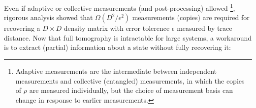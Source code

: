 \documentclass[
aps,
pra,
twocolumn,
floatfix,
]{revtex4-2}
\theoremstyle{plain}
\theoremstyle{definition}
\newtheorem{problem}{Problem}
\newcommand{\ob}{O}
\newcommand{\dm}{\rho}
\newcommand{\bmsigma}{\bm{\sigma}}
\begin{document}
Even if adaptive or collective measurements (and post-processing) allowed 
\footnote{Adaptive measurements are the intermediate between independent measurements and collective (entangled) measurements, in which the copies of $\dm$ are measured individually, but the choice of measurement basis can change in response to earlier measurements.},
rigorous analysis \cite{haahSampleoptimalTomographyQuantum2017} \cite{odonnellEfficientQuantumTomography2016} showed that 
$\Omega(D^2/\epsilon^2)$ measurements (copies)  are required for recovering a $D\times D$ density matrix
with error tolerence $\epsilon$ measured by trace distance.
Now that full tomography is intractable for large systems, a workaround is to extract (partial) information about a state without fully recovering it:
\end{document}
